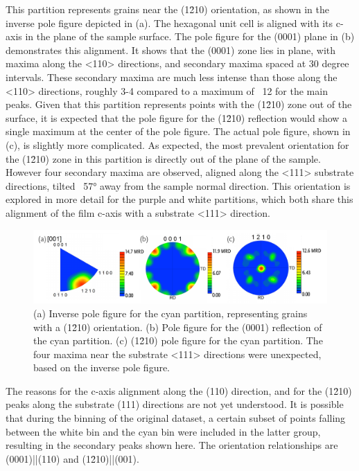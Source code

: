 This partition represents grains near  the (1\={2}10) orientation, as shown in the inverse
pole figure depicted in (a). The hexagonal unit cell is aligned with
its c-axis in the plane of the sample surface. The pole figure for the (0001) plane in
(b) demonstrates this alignment. It shows that the (0001) zone lies in
plane, with maxima along the <110> directions, and secondary maxima spaced at 30 degree
intervals. These secondary maxima are much less intense than those along the <110> directions, roughly 3-4  compared to a maximum of ~12 for the main peaks.
Given that this partition represents points with the (1\={2}10) zone out of the surface,
it is expected that the pole figure for the (1\={2}10) reflection would show a single
maximum at the center of the pole figure. The actual pole figure, shown in
(c), is slightly more complicated. As expected, the most prevalent
orientation for the (1\={2}10) zone in this partition is directly out of the plane of the
sample. However four secondary maxima are observed, aligned along the <111> substrate
directions, tilted ~57\si{\degree} away from the sample normal direction. This orientation
is explored in more detail for the purple and white partitions, which both share this
alignment of the film c-axis with a substrate <111> direction.
\begin{figure}
	\includegraphics[width=\textwidth]{cyanall.pdf}
		\caption[Pole figure for cyan partition]{%
			(a) Inverse pole figure for the cyan partition, representing grains with 
	a (1\={2}10) orientation. (b) Pole figure for the (0001) reflection of the cyan
partition. (c) (1\={2}10) pole figure for the cyan partition. The four maxima near 
	the substrate <111> directions were unexpected, based on the inverse 
	pole figure.}
	\label{fig:cyanall}
\end{figure}
The reasons for the c-axis alignment along the (110) direction, and for the (1\={2}10)
peaks along the substrate (111) directions are not yet understood. It is possible that 
during the binning of the original dataset, a certain subset of points falling between the 
white bin and the cyan bin were included in the latter group, resulting in the secondary 
peaks shown here. The orientation relationships are (0001)||(110) and
(1\={2}10)||(001).


